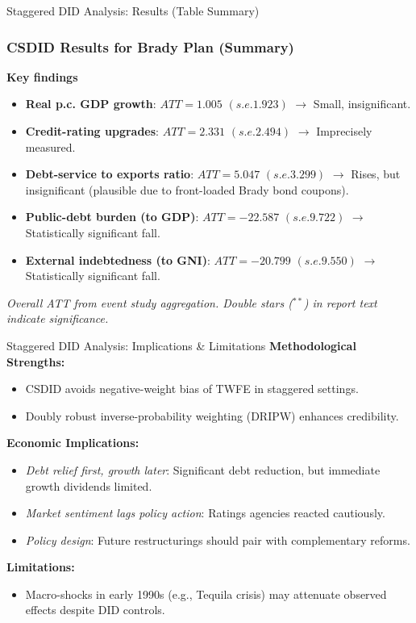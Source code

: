 \documentclass{beamer}
\begin{document}
\begin{frame}{Staggered DID Analysis: Results (Table Summary)}
  \frametitle{CSDID Results for Brady Plan (Summary)}
  \textbf{Key findings}
  \begin{itemize}
    \item \textbf{Real p.c. GDP growth}: $ATT = 1.005$ $(s.e. 1.923)$ $\rightarrow$ Small, insignificant.
    \item \textbf{Credit-rating upgrades}: $ATT = 2.331$ $(s.e. 2.494)$ $\rightarrow$ Imprecisely measured.
    \item \textbf{Debt-service to exports ratio}: $ATT = 5.047$ $(s.e. 3.299)$ $\rightarrow$ Rises, but insignificant (plausible due to front-loaded Brady bond coupons).
    \item \textbf{Public-debt burden (to GDP)}: $ATT = -22.587$ $(s.e. 9.722)$ $\rightarrow$ Statistically significant fall.
    \item \textbf{External indebtedness (to GNI)}: $ATT = -20.799$ $(s.e. 9.550)$ $\rightarrow$ Statistically significant fall.
  \end{itemize}
   \textit{Overall ATT from event study aggregation. Double stars ($^{**}$) in report text indicate significance.}
\end{frame}

\begin{frame}{Staggered DID Analysis: Implications \& Limitations}
  \textbf{Methodological Strengths:}
  \begin{itemize}
    \item CSDID avoids negative-weight bias of TWFE in staggered settings.
    \item Doubly robust inverse-probability weighting (DRIPW) enhances credibility.
  \end{itemize}
  \textbf{Economic Implications:}
  \begin{itemize}
    \item \textit{Debt relief first, growth later}: Significant debt reduction, but immediate growth dividends limited.
    \item \textit{Market sentiment lags policy action}: Ratings agencies reacted cautiously.
    \item \textit{Policy design}: Future restructurings should pair with complementary reforms.
  \end{itemize}
  \textbf{Limitations:}
  \begin{itemize}
    \item Macro-shocks in early 1990s (e.g., Tequila crisis) may attenuate observed effects despite DID controls.
  \end{itemize}
\end{frame}
\end{document}
